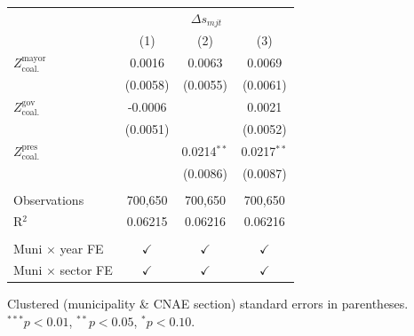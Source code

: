 \begingroup
\centering
\begin{tabular}{lccc}
   \toprule
    & \multicolumn{3}{c}{$\Delta s_{mjt}$}\\
                                       & (1)           & (2)           & (3)\\  
   \midrule 
   $Z^{\text{mayor}}_{\text{coal.}}$   & 0.0016        & 0.0063        & 0.0069\\   
                                       & (0.0058)      & (0.0055)      & (0.0061)\\   
   $Z^{\text{gov}}_{\text{coal.}}$     & -0.0006       &               & 0.0021\\   
                                       & (0.0051)      &               & (0.0052)\\   
   $Z^{\text{pres}}_{\text{coal.}}$    &               & 0.0214$^{**}$ & 0.0217$^{**}$\\   
                                       &               & (0.0086)      & (0.0087)\\   
    \\
   Observations                        & 700,650       & 700,650       & 700,650\\  
   R$^2$                               & 0.06215       & 0.06216       & 0.06216\\  
    \\
   Muni $\times$ year FE               & $\checkmark$  & $\checkmark$  & $\checkmark$\\   
   Muni $\times$ sector FE             & $\checkmark$  & $\checkmark$  & $\checkmark$\\   
   \bottomrule
\end{tabular}
 
\par \raggedright 
Clustered (municipality \& CNAE section) standard errors in parentheses. $^{***}p<0.01$, $^{**}p<0.05$, $^{*}p<0.10$.
\par\endgroup

